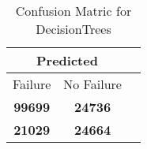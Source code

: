 \begin{table}[] 
\label{Table: Prediction Accuracy-DMDDecisionTreesOnlySunEKF-resetReflection-Reflection} 
\caption{Confusion Matric for DecisionTrees} 
\centering 
\begin{tabular} 
 {@{}ccc@{}} 
\toprule 
\multicolumn{2}{c}{\textbf{Predicted}}
 \\ \midrule 
\multicolumn{1}{|c|}{Failure} & 
\multicolumn{1}{c|}{No Failure}
 \\ \midrule 
\multicolumn{1}{|c|}{\color{green}\textbf{99699}} & 
\multicolumn{1}{c|}{\color{green}\textbf{24736}}
 \\ \midrule 
\multicolumn{1}{|c|}{\color{red}\textbf{21029}} & 
\multicolumn{1}{c|}{\color{red}\textbf{24664}}
 \\ \bottomrule 
\end{tabular} 
\end{table} 
